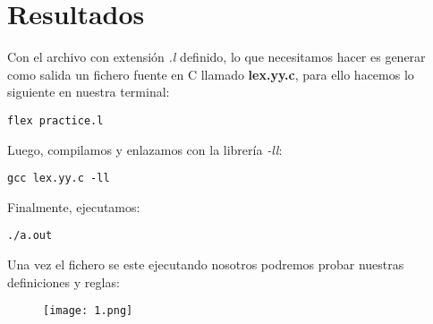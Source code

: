 \section{Resultados}

Con el archivo con extensión \textit{.l} definido, lo que necesitamos hacer es generar como salida un fichero fuente en C llamado \textbf{lex.yy.c}, para ello hacemos lo siguiente en nuestra terminal:

\begin{lstlisting}
flex practice.l
\end{lstlisting}

Luego, compilamos y enlazamos con la librería \textit{-ll}:

\begin{lstlisting}
gcc lex.yy.c -ll
\end{lstlisting}

Finalmente, ejecutamos:

\begin{lstlisting}
./a.out
\end{lstlisting}

Una vez el fichero se este ejecutando nosotros podremos probar nuestras definiciones y reglas:

\begin{figure}[H]
\texttt{[image: 1.png]}
\centering \linebreak {}
\end{figure} 

\pagebreak